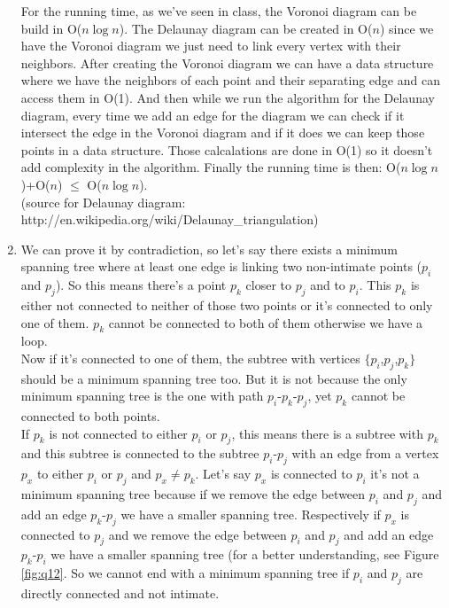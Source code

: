 \begin{enumerate}
For the running time, as we've seen in class, the Voronoi diagram can be build in O($n\log n$). The Delaunay diagram can be created in O($n$) since we have the Voronoi diagram we just need to link every vertex with their neighbors. After creating the Voronoi diagram we can have a data structure where we have the neighbors of each point and their separating edge and can access them in O(1). And then while we run the algorithm for the Delaunay diagram, every time we add an edge for the diagram we can check if it intersect the edge in the Voronoi diagram and if it does we can keep those points in a data structure. Those calcalations are done in O(1) so it doesn't add complexity in the algorithm. Finally the running time is then: O($n\log n$)+O($n$) $\leq$ O($n \log n$).\\
(source for Delaunay diagram: http://en.wikipedia.org/wiki/Delaunay\_triangulation)
\item We can prove it by contradiction, so let's say there exists a minimum spanning tree where at least one edge is linking two non-intimate points ($p_i$ and $p_j$). So this means there's a point $p_k$ closer to $p_j$ and to $p_i$. This $p_k$ is either not connected to neither of those two points or it's connected to only one of them. $p_k$ cannot be connected to both of them otherwise we have a loop.\\
Now if it's connected to one of them, the subtree with vertices $\{$$p_i$,$p_j$,$p_k$$\}$ should be a minimum spanning tree too. But it is not because the only minimum spanning tree is the one with path $p_i$-$p_k$-$p_j$, yet $p_k$ cannot be connected to both points.\\
If $p_k$ is not connected to either $p_i$ or $p_j$, this means there is a subtree with $p_k$ and this subtree is connected to the subtree $p_i$-$p_j$ with an edge from a vertex $p_x$ to either $p_i$ or $p_j$ and $p_x \neq p_k$. Let's say $p_x$ is connected to $p_i$ it's not a minimum spanning tree because if we remove the edge between $p_i$ and $p_j$ and add an edge $p_k$-$p_j$ we have a smaller spanning tree. Respectively if $p_x$ is connected to $p_j$ and we remove the edge between $p_i$ and $p_j$ and add an edge $p_k$-$p_i$ we have a smaller spanning tree (for a better understanding, see Figure \ref{fig:q12}. So we cannot end with a minimum spanning tree if $p_i$ and $p_j$ are directly connected and not intimate.
\begin{figure}[ht]
  \centering

\end{figure}
\end{enumerate}
